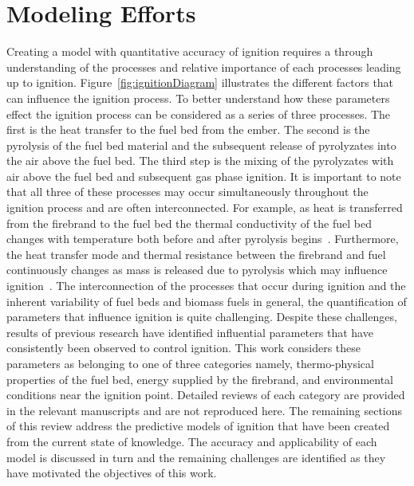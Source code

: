 \section{Modeling Efforts}
    Creating a model with quantitative accuracy of ignition requires a through understanding of the processes and relative importance of each processes leading up to ignition. Figure~\ref{fig:ignitionDiagram} illustrates the different factors that can influence the ignition process. To better understand how these parameters effect the ignition process can be considered as a series of three processes.  The first is the heat transfer to the fuel bed from the ember. The second is the pyrolysis of the fuel bed material and the subsequent release of pyrolyzates into the air above the fuel bed. The third step is the mixing of the pyrolyzates with air above the fuel bed and subsequent gas phase ignition. It is important to note that all three of these processes may occur simultaneously throughout the ignition process and are often interconnected. For example, as heat is transferred from the firebrand to the fuel bed the thermal conductivity of the fuel bed changes with temperature both before and after pyrolysis begins~\cite{Fjellerup2003}. Furthermore, the heat transfer mode and thermal resistance between the firebrand and fuel continuously changes as mass is released due to pyrolysis which may influence ignition~\cite{Yang2016EffectParticle}. The interconnection of the processes that occur during ignition and the inherent variability of fuel beds and biomass fuels in general, the quantification of parameters that influence ignition is quite challenging. Despite these challenges, results of previous research have identified influential parameters that have consistently been observed to control ignition. This work considers these parameters as belonging to one of three categories namely, thermo-physical properties of the fuel bed, energy supplied by the firebrand, and environmental conditions near the ignition point. Detailed reviews of each category are provided in the relevant manuscripts and are not reproduced here. The remaining sections of this review address the predictive models of ignition that have been created from the current state of knowledge. The accuracy and applicability of each model is discussed in turn and the remaining challenges are identified as they have motivated the objectives of this work. 
